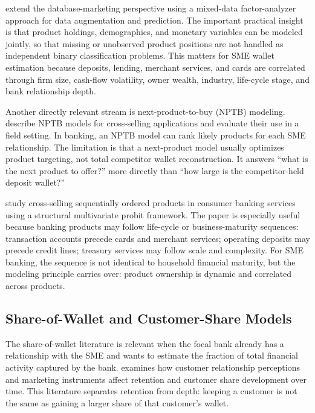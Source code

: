 \documentclass[11pt]{article}
\begin{document}
\citet{kamakura2003database} extend the database-marketing perspective using a
mixed-data factor-analyzer approach for data augmentation and prediction. The
important practical insight is that product holdings, demographics, and monetary
variables can be modeled jointly, so that missing or unobserved product
positions are not handled as independent binary classification problems. This
matters for SME wallet estimation because deposits, lending, merchant services,
and cards are correlated through firm size, cash-flow volatility, owner wealth,
industry, life-cycle stage, and bank relationship depth.

Another directly relevant stream is next-product-to-buy (NPTB) modeling.
\citet{knott2002nptb} describe NPTB models for cross-selling applications and
evaluate their use in a field setting. In banking, an NPTB model can rank likely
products for each SME relationship. The limitation is that a next-product model
usually optimizes product targeting, not total competitor wallet reconstruction.
It answers ``what is the next product to offer?'' more directly than ``how large
is the competitor-held deposit wallet?''

\citet{li2005sequential} study cross-selling sequentially ordered products in
consumer banking services using a structural multivariate probit framework. The
paper is especially useful because banking products may follow life-cycle or
business-maturity sequences: transaction accounts precede cards and merchant
services; operating deposits may precede credit lines; treasury services may
follow scale and complexity. For SME banking, the sequence is not identical to
household financial maturity, but the modeling principle carries over: product
ownership is dynamic and correlated across products.

\subsection{Share-of-Wallet and Customer-Share Models}

The share-of-wallet literature is relevant when the focal bank already has a
relationship with the SME and wants to estimate the fraction of total financial
activity captured by the bank. \citet{verhoef2003crm} examines how customer
relationship perceptions and marketing instruments affect retention and
customer share development over time. This literature separates retention from
depth: keeping a customer is not the same as gaining a larger share of that
customer's wallet.
\end{document}
